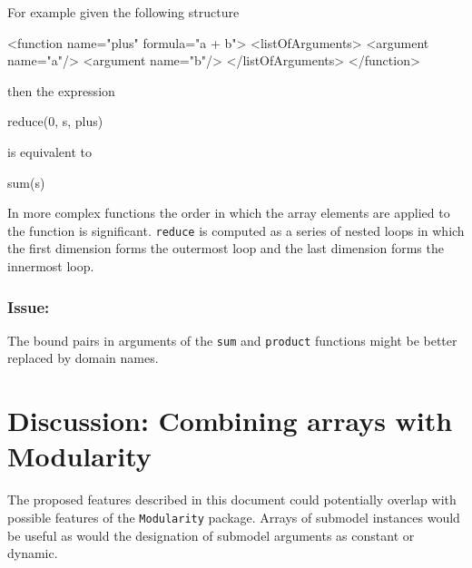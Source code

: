 \documentclass{cekarticle}
\begin{document}
For example given the following structure
\begin{example}
<function name="plus" formula="a + b">
    <listOfArguments>
        <argument name="a"/>
        <argument name="b"/>
    </listOfArguments>
</function>
\end{example}
then the expression
\begin{example}
reduce(0, s, plus)
\end{example}
is equivalent to
\begin{example}
sum(s)
\end{example}

In more complex functions the order in which the array elements
are applied to the function is significant.  \texttt{reduce} is
computed as a series of nested loops in which the first dimension
forms the outermost loop and the last dimension forms the
innermost loop.

\subsubsection{Issue:}
The bound pairs in arguments of the \texttt{sum} and
\texttt{product} functions might be better replaced by domain names.

\section{Discussion: Combining arrays with Modularity}
The proposed features described in this document could
potentially overlap with possible features of the
\texttt{Modularity} package. Arrays of submodel instances would
be useful as would the designation of submodel arguments as
constant or dynamic.
\appendix
\end{document}
